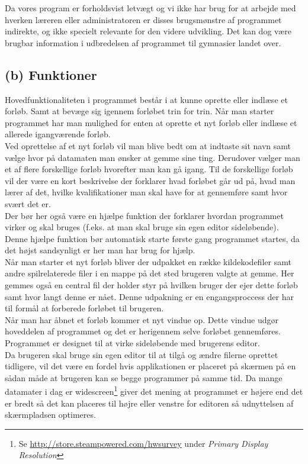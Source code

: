 \documentclass[10pt,a4paper,danish]{article}
\begin{document}
Da vores program er forholdsvist letvægt og vi ikke har brug for at arbejde med hverken læreren eller administratoren er disses brugsmønstre af programmet indirekte, og ikke specielt relevante for den videre udvikling. Det kan dog være brugbar information i udbredelsen af programmet til gymnasier landet over.

\subsection{(b) Funktioner}
Hovedfunktionaliteten i programmet består i at kunne oprette eller indlæse et forløb. Samt at bevæge sig igennem forløbet trin for trin.
Når man starter programmet har man mulighed for enten at oprette et nyt forløb eller indlæse et allerede igangværende forløb.\\

Ved oprettelse af et nyt forløb vil man blive bedt om at indtaste sit navn samt vælge hvor på datamaten man ønsker at gemme sine ting. Derudover vælger man et af flere forskellige forløb hvorefter man kan gå igang. Til de forskellige forløb vil der være en kort beskrivelse der forklarer hvad forløbet går ud på, hvad man lærer af det, hvilke kvalifikationer man skal have for at gennemføre samt hvor svært det er.\\

Der bør her også være en hjælpe funktion der forklarer hvordan programmet virker og skal bruges (f.eks. at man skal bruge sin egen editor sideløbende). Denne hjælpe funktion bør automatisk starte første gang programmet startes, da det højst sandsynligt er her man har brug for hjælp.\\

Når man starter et nyt forløb bliver der udpakket en række kildekodefiler samt andre spilrelaterede filer i en mappe på det sted brugeren valgte at gemme. Her gemmes også en central fil der holder styr på hvilken bruger der ejer dette forløb samt hvor langt denne er nået. Denne udpakning er en engangsproccess der har til formål at forberede forløbet til brugeren.\\

Når man har åbnet et forløb kommer et nyt vindue op. Dette vindue udgør hoveddelen af programmet og det er herigennem selve forløbet gennemføres. Programmet er designet til at virke sideløbende med brugerens editor.\\

Da brugeren skal bruge sin egen editor til at tilgå og ændre filerne oprettet tidligere, vil det være en fordel hvis applikationen er placeret på skærmen på en sådan måde at brugeren kan se begge programmer på samme tid.
Da mange datamater i dag er widescreen\footnote{Se \url{http://store.steampowered.com/hwsurvey} under \textit{Primary Display Resolution}}
giver det mening at programmet er højere end det er bredt så det kan placeres til højre eller venstre for editoren så udnyttelsen af skærmpladsen optimeres.
\end{document}
